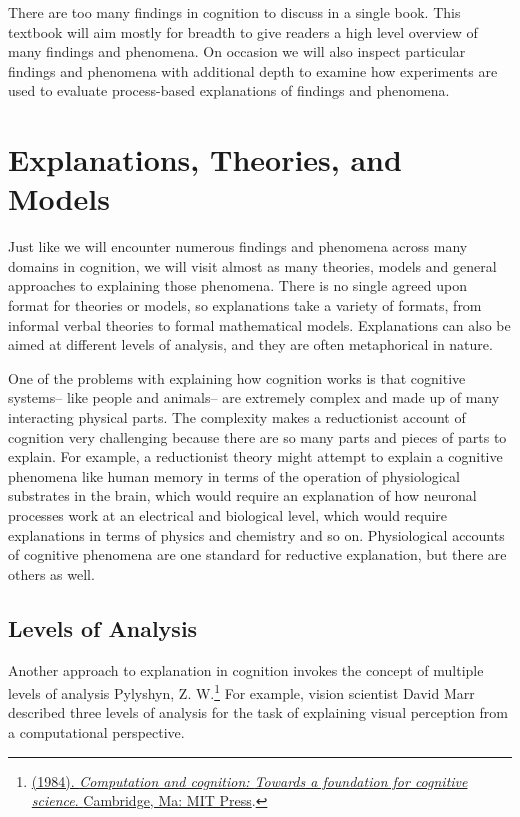 \documentclass[
  oneside,
  12pt]{crumpbook}
\begin{document}
There are too many findings in cognition to discuss in a single book. This textbook will aim mostly for breadth to give readers a high level overview of many findings and phenomena. On occasion we will also inspect particular findings and phenomena with additional depth to examine how experiments are used to evaluate process-based explanations of findings and phenomena.

\hypertarget{explanations-theories-and-models}{%
\section{Explanations, Theories, and Models}\label{explanations-theories-and-models}}

Just like we will encounter numerous findings and phenomena across many domains in cognition, we will visit almost as many theories, models and general approaches to explaining those phenomena. There is no single agreed upon format for theories or models, so explanations take a variety of formats, from informal verbal theories to formal mathematical models. Explanations can also be aimed at different levels of analysis, and they are often metaphorical in nature.

One of the problems with explaining how cognition works is that cognitive systems-- like people and animals-- are extremely complex and made up of many interacting physical parts. The complexity makes a reductionist account of cognition very challenging because there are so many parts and pieces of parts to explain. For example, a reductionist theory might attempt to explain a cognitive phenomena like human memory in terms of the operation of physiological substrates in the brain, which would require an explanation of how neuronal processes work at an electrical and biological level, which would require explanations in terms of physics and chemistry and so on. Physiological accounts of cognitive phenomena are one standard for reductive explanation, but there are others as well.

\hypertarget{levels-of-analysis}{%
\subsection{Levels of Analysis}\label{levels-of-analysis}}

Another approach to explanation in cognition invokes the concept of multiple levels of analysis Pylyshyn, Z. W.\footnote{\protect\hyperlink{ref-pylyshynComputationCognitionFoundation1984}{(1984). \emph{Computation and cognition: {Towards} a foundation for cognitive science}. {Cambridge, Ma: MIT Press}}.} For example, vision scientist David Marr described three levels of analysis for the task of explaining visual perception from a computational perspective.
\end{document}
